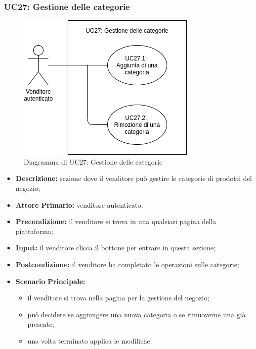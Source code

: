 \subsubsection{UC27: Gestione delle categorie}
\label{sec:UC27}
\begin{figure}[!ht]
    \caption{Diagramma di UC27: Gestione delle categorie}
    \vspace{10px}
    \includegraphics[scale=0.5]{../../../Images/AnalisiRequisiti/UC27}
    \centering
\end{figure}
\begin{itemize}
    \item \textbf{Descrizione:} sezione dove il venditore può gestire le categorie di prodotti del negozio;
    \item \textbf{Attore Primario:} venditore autenticato;
    \item \textbf{Precondizione:} il venditore si trova in una qualsiasi pagina della piattaforma;
    \item \textbf{Input:} il venditore clicca il bottone per entrare in questa sezione;
    \item \textbf{Postcondizione:} il venditore ha completato le operazioni sulle categorie;
    \item \textbf{Scenario Principale:}
          \begin{itemize}
              \item il venditore si trova nella pagina per la gestione del negozio;
              \item può decidere se aggiungere una nuova categoria o se rimuoverne una già presente;
              \item una volta terminato applica le modifiche.
          \end{itemize}
\end{itemize}

